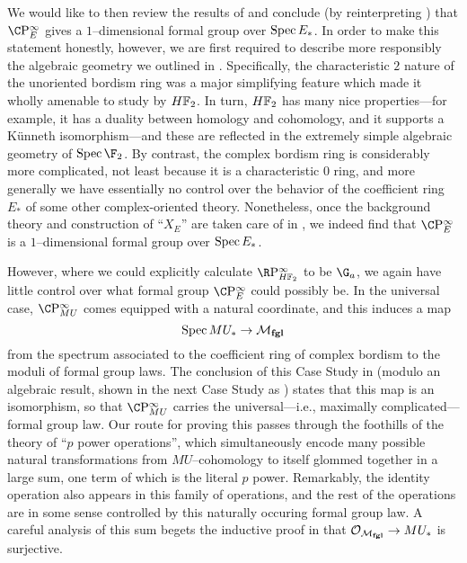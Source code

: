 We would like to then review the results of  and conclude (by reinterpreting ) that \(\CP^\infty_E\) gives a \(1\)--dimensional formal group over \(\operatorname{Spec} E_*\).  In order to make this statement honestly, however, we are first required to describe more responsibly the algebraic geometry we outlined in .  Specifically, the characteristic \(2\) nature of the unoriented bordism ring was a major simplifying feature which made it wholly amenable to study by \(\HFtwo\).  In turn, \(\HFtwo\) has many nice properties---for example, it has a duality between homology and cohomology, and it supports a K\"unneth isomorphism---and these are reflected in the extremely simple algebraic geometry of \(\Spec \F_2\).  By contrast, the complex bordism ring is considerably more complicated, not least because it is a characteristic \(0\) ring, and more generally we have essentially no control over the behavior of the coefficient ring \(E_*\) of some other complex-oriented theory.  Nonetheless, once the background theory and construction of ``\(X_E\)'' are taken care of in , we indeed find that \(\CP^\infty_E\) is a \(1\)--dimensional formal group over \(\operatorname{Spec} E_*\).

However, where we could explicitly calculate \(\RP^\infty_{\HFtwo}\) to be \(\G_a\), we again have little control over what formal group \(\CP^\infty_E\) could possibly be.  In the universal case, \(\CP^\infty_{MU}\) comes equipped with a natural coordinate, and this induces a map \[\operatorname{Spec} MU_* \to \mathcal{M}_{\mathbf{fgl}}\] from the spectrum associated to the coefficient ring of complex bordism to the moduli of formal group laws.  The conclusion of this Case Study in  (modulo an algebraic result, shown in the next Case Study as ) states that this map is an isomorphism, so that \(\CP^\infty_{MU}\) carries the universal---i.e., maximally complicated---formal group law.  Our route for proving this passes through the foothills of the theory of ``\(p\){\th} power operations'', which simultaneously encode many possible natural transformations from \(MU\)--cohomology to itself glommed together in a large sum, one term of which is the literal \(p\){\th} power.  Remarkably, the identity operation also appears in this family of operations, and the rest of the operations are in some sense controlled by this naturally occuring formal group law.  A careful analysis of this sum begets the inductive proof in  that \(\mathcal{O}_{\mathcal{M}_{\mathbf{fgl}}} \to MU_*\) is surjective.

